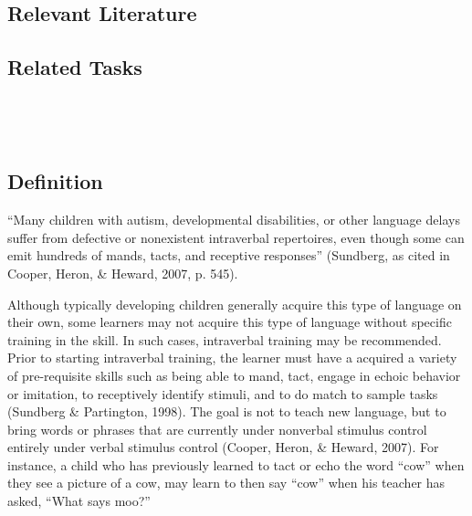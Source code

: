 \subsection{Relevant Literature}
\begin{refsection}
\nocite{test,alang2017police,clayton2018black}
\printbibliography[heading=none]
\end{refsection}
%
\subsection{Related Tasks}
\fourdTwelve{}\\
\fourFKFourtyFive{}\\
%
%
%
%
%
\section{\fourdThirteen{}}
\subsection{Definition}
``Many children with autism, developmental disabilities, or other language delays suffer from defective or nonexistent intraverbal repertoires, even though some can emit hundreds of mands, tacts, and receptive responses'' (Sundberg, as cited in Cooper, Heron, \& Heward, 2007, p. 545).  

Although typically developing children generally acquire this type of language on their own, some learners may not acquire this type of language without specific training in the skill.  In such cases, intraverbal training may be recommended.  Prior to starting intraverbal training, the learner must have a acquired a variety of pre-requisite skills such as being able to mand, tact, engage in echoic behavior or imitation, to receptively identify stimuli, and to do match to sample tasks (Sundberg \& Partington, 1998). The goal is not to teach new language, but to bring words or phrases that are currently under nonverbal stimulus control entirely under verbal stimulus control (Cooper, Heron, \& Heward, 2007).  For instance, a child who has previously learned to tact or echo the word ``cow'' when they see a picture of a cow, may learn to then say ``cow'' when his teacher has asked, ``What says moo?''

